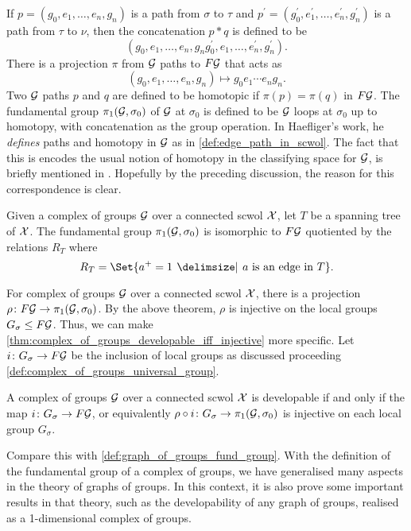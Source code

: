 If $p = (g_0, e_1, \ldots, e_n, g_n)$ is a path from $\sigma$ to  $\tau$ and  $p^\prime = (g^\prime_0, e^\prime_1, \ldots, e^\prime_n, g^\prime_n)$ is a path from $\tau$ to $\nu$, then the concatenation  $p \ast q$ is defined to be
\[
	(g_0, e_1, \ldots, e_n, g_ng^\prime_0, e_1, \ldots, e^\prime_n, g^\prime_n)
	.\]
There is a projection $\pi$ from $\mathcal{G}$ paths to $F\mathcal{G}$ that acts as
\[
	(g_0, e_1, \ldots, e_n, g_n) \mapsto g_0e_1\cdots e_ng_n
	.\]
Two $\mathcal{G}$ paths  $p$ and $q$ are defined to be homotopic if $\pi(p) = \pi(q)$ in $F\mathcal{G}$.
The fundamental group $\pi_1(\mathcal{G}, \sigma_0)$ of $\mathcal{G}$ at $\sigma_0$ is defined to be $\mathcal{G}$ loops at  $\sigma_0$ up to homotopy, with concatenation as the group operation.
In Haefliger's work, he \emph{defines} paths and homotopy in $\mathcal{G}$ as in \cref{def:edge_path_in_scwol}.
The fact that this is encodes the usual notion of homotopy in the classifying space for $\mathcal{G}$, is briefly mentioned in \cite[Section 3.1.a]{haefliger_complexes_1991}.
Hopefully by the preceding discussion, the reason for this correspondence is clear.
\begin{theorem}
	Given a complex of groups $\mathcal{G}$ over a connected scwol  $\mathcal{X}$, let $T$ be a spanning tree of  $\mathcal{X}$.
	The fundamental group  $\pi_1(\mathcal{G}, \sigma_0)$ is isomorphic to $F\mathcal{G}$ quotiented by the relations  $R_T$ where
	\[
		R_T = \Set{a^+ = 1 \given a \text{ is an edge in } T}
		.\]
\end{theorem}
For complex of groups $\mathcal{G}$ over a connected scwol $\mathcal{X}$, there is a projection $\rho \colon F\mathcal{G} \to \pi_1(\mathcal{G},\sigma_0)$.
By the above theorem, $\rho$ is injective on the local groups $G_\sigma \leq F\mathcal{G}$.
Thus, we can make \cref{thm:complex_of_groups_developable_iff_injective} more specific.
Let $i \colon G_\sigma \to F\mathcal{G}$ be the inclusion of local groups as discussed proceeding \cref{def:complex_of_groups_universal_group}.
\begin{theorem}
	A complex of groups $\mathcal{G}$ over a connected scwol  $\mathcal{X}$ is developable if and only if the map $i \colon G_\sigma \to F\mathcal{G}$, or equivalently $\rho \circ i \colon G_\sigma \to \pi_1(\mathcal{G}, \sigma_0)$ is injective on each local group $G_\sigma$.
\end{theorem}
Compare this with \cref{def:graph_of_groups_fund_group}.
With the definition of the fundamental group of a complex of groups, we have generalised many aspects in the theory of graphs of groups.
In this context, it is also prove some important results in that theory, such as the developability of any graph of groups, realised as a 1-dimensional complex of groups.

